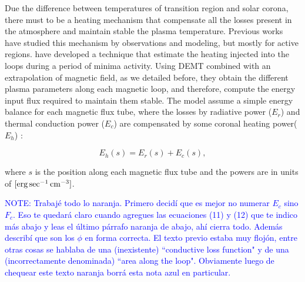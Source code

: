 \documentclass[namedreferences]{solarphysics}
\def\notebyalbert#1{\textcolor{blue}{NOTE: #1}}
\begin{document}
\begin{article}

Due the difference between temperatures of transition region and solar corona, there must to be a heating mechanism that compensate all the losses present in the atmosphere and maintain stable the plasma temperature. Previous works have studied this mechanism by observations and modeling, but mostly for active regions. \citet{maccormack_2017} have developed a technique that estimate the heating injected into the loops during a period of minima activity. Using DEMT combined with an extrapolation of magnetic field, as we detailed before, they obtain the different plasma parameters along each magnetic loop, and therefore, compute the energy input flux required to maintain them stable.
The model assume a simple energy balance for each magnetic flux tube, where the losses by radiative power ($E_r$) and thermal conduction power ($E_c$) are compensated by some coronal heating power($E_h$) \citep{aschwanden_2004}:

\begin{equation}\label{Balance}
E_h(s) = E_r(s)+ E_c(s),
\end{equation}

\noindent
where $s$ is the position along each magnetic flux tube and the powers are in units of $[{\rm erg\,sec^{-1}\,cm^{-3}}]$.

\noindent\notebyalbert{Trabajé todo lo naranja. Primero decidí que es mejor no numerar $E_c$ sino $F_c$. Eso te quedará claro cuando agregues las ecuaciones (11) y (12) que te indico más abajo y leas el último párrafo naranja de abajo, ahí cierra todo. Además describí que son los $\phi$ en forma correcta. El texto previo estaba muy flojón, entre otras cosas se hablaba de una (inexistente) ``conductive loss function" y de una (incorrectamente denominada) ``area along the loop". Obviamente luego de chequear este texto naranja borrá esta nota azul en particular.}


\end{article}
\end{document}
